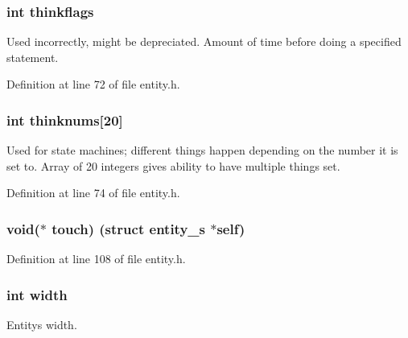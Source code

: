 \subsubsection[{thinkflags}]{\setlength{\rightskip}{0pt plus 5cm}int thinkflags}\label{structentity__s_a7cb2b75bb66761caa1cfd378e8c4d206}


Used incorrectly, might be depreciated. Amount of time before doing a specified statement. 



Definition at line 72 of file entity.\+h.

\hypertarget{structentity__s_a3688a13a7bb7a088e86bc07f1c0502b8}{}
\subsubsection[{thinknums}]{\setlength{\rightskip}{0pt plus 5cm}int thinknums\mbox{[}20\mbox{]}}\label{structentity__s_a3688a13a7bb7a088e86bc07f1c0502b8}


Used for state machines; different things happen depending on the number it is set to. Array of 20 integers gives ability to have multiple things set. 



Definition at line 74 of file entity.\+h.

\hypertarget{structentity__s_aa818c2577d3f6bcf8cf087c1b2c27227}{}
\subsubsection[{touch}]{\setlength{\rightskip}{0pt plus 5cm}void($\ast$ touch) (struct {\bf entity\+\_\+s} $\ast$self)}\label{structentity__s_aa818c2577d3f6bcf8cf087c1b2c27227}


Definition at line 108 of file entity.\+h.

\hypertarget{structentity__s_a2474a5474cbff19523a51eb1de01cda4}{}
\subsubsection[{width}]{\setlength{\rightskip}{0pt plus 5cm}int width}\label{structentity__s_a2474a5474cbff19523a51eb1de01cda4}


Entity\textquotesingle{}s width. 



